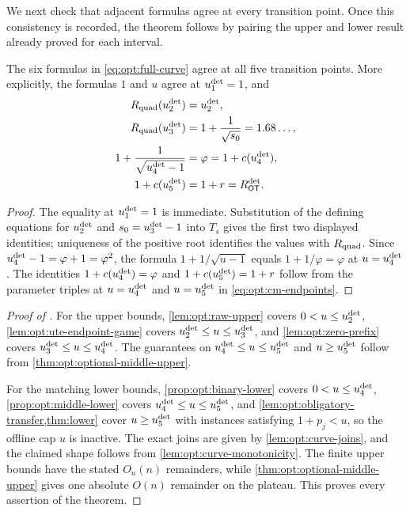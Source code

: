 We next check that adjacent formulas agree at every transition point.  Once
this consistency is recorded, the theorem follows by pairing the upper and
lower result already proved for each interval.

\begin{lemma}
\label{lem:opt:curve-joins}
The six formulas in \cref{eq:opt:full-curve} agree at all five transition
points.  More explicitly, the formulas $1$ and $u$ agree at
$u_{1}^{\mathrm{det}}=1$, and
\begin{align}
 R_{\mathrm{quad}}(u_{2}^{\mathrm{det}})&=u_{2}^{\mathrm{det}},
 \notag\\
 R_{\mathrm{quad}}(u_{3}^{\mathrm{det}})&=1+\frac1{\sqrt{s_0}}
              =1.68\ldots,
 \notag\\
 1+\frac1{\sqrt{u_{4}^{\mathrm{det}}-1}}&=\varphi
              =1+c(u_{4}^{\mathrm{det}}),
 \notag\\
 1+c(u_{5}^{\mathrm{det}})&=1+r=R_{\mathsf{OT}}^{\mathrm{det}}.
 \label{eq:opt:curve-joins}
\end{align}
\end{lemma}

\begin{proof}
The equality at $u_{1}^{\mathrm{det}}=1$ is immediate.  Substitution of the defining
equations for $u_{2}^{\mathrm{det}}$ and $s_0=u_{3}^{\mathrm{det}}-1$ into $T_s$ gives the first
two displayed identities; uniqueness of the positive root identifies the
values with $R_{\mathrm{quad}}$.  Since
$u_{4}^{\mathrm{det}}-1=\varphi+1=\varphi^2$, the formula
$1+1/\sqrt{u-1}$ equals $1+1/\varphi=\varphi$ at $u=u_{4}^{\mathrm{det}}$.
The identities $1+c(u_{4}^{\mathrm{det}})=\varphi$ and
$1+c(u_{5}^{\mathrm{det}})=1+r$ follow from the parameter triples at
$u=u_{4}^{\mathrm{det}}$ and $u=u_{5}^{\mathrm{det}}$ in \cref{eq:opt:cm-endpoints}.
\end{proof}

\begin{proof}[Proof of ]
For the upper bounds, \cref{lem:opt:raw-upper} covers
$0<u\le u_{2}^{\mathrm{det}}$, \cref{lem:opt:ute-endpoint-game} covers
$u_{2}^{\mathrm{det}}\le u\le u_{3}^{\mathrm{det}}$, and \cref{lem:opt:zero-prefix} covers
$u_{3}^{\mathrm{det}}\le u\le u_{4}^{\mathrm{det}}$.  The guarantees on
$u_{4}^{\mathrm{det}}\le u\le u_{5}^{\mathrm{det}}$ and $u\ge u_{5}^{\mathrm{det}}$ follow from
\cref{thm:opt:optional-middle-upper}.

For the matching lower bounds, \cref{prop:opt:binary-lower} covers
$0<u\le u_{4}^{\mathrm{det}}$, \cref{prop:opt:middle-lower} covers
$u_{4}^{\mathrm{det}}\le u\le u_{5}^{\mathrm{det}}$, and
\cref{lem:opt:obligatory-transfer,thm:lower} cover $u\ge u_{5}^{\mathrm{det}}$ with
instances satisfying $1+p_j<u$, so the offline cap $u$ is inactive.  The
exact joins are given by
\cref{lem:opt:curve-joins}, and the claimed shape follows from
\cref{lem:opt:curve-monotonicity}.  The finite upper bounds have the stated
$O_u(n)$ remainders, while
\cref{thm:opt:optional-middle-upper} gives one absolute $O(n)$ remainder on
the plateau.  This proves every assertion of the theorem.
\end{proof}

